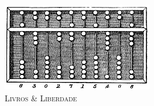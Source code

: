 \newgeometry{
	hmargin={2.5cm,2.5cm}, %
	vmargin={3cm,1cm} %
}

\thispagestyle{empty}

\begin{flushleft}
	\vspace*{2cm}
	\Huge\textbf{\titulo}
\end{flushleft}

\cleardoublepage

\thispagestyle{empty}

\begin{flushleft}
	\Large \autor
	\vspace{2cm}\\
	\Huge\textbf{\titulo}
	\vspace{0.5cm}\\
	\Large\subtitulo
\end{flushleft}

	\vfill

\begin{figure}[!h]
	\centering
	\includegraphics[scale=0.5]{./imagens/abacus}
	\caption*{\scshape Livros \& Liberdade}
\end{figure}

\clearpage

\restoregeometry